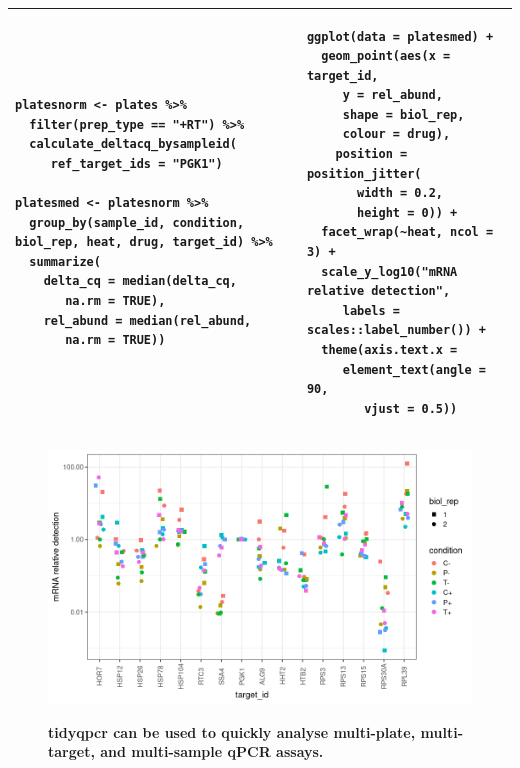 \documentclass{SBCbookchapter}
\begin{document}
\begin{center}
\begin{tabular}{| p{5.6cm}  p{5.6cm} |}
\hline
 \begin{lstlisting}[firstnumber=70]
 platesnorm <- plates %>%
  filter(prep_type == "+RT") %>%
  calculate_deltacq_bysampleid(
     ref_target_ids = "PGK1")

platesmed <- platesnorm %>%
  group_by(sample_id, condition, biol_rep, heat, drug, target_id) %>%
  summarize(
    delta_cq = median(delta_cq,
       na.rm = TRUE),
    rel_abund = median(rel_abund,
       na.rm = TRUE))
 \end{lstlisting}& 
 \begin{lstlisting}[firstnumber=83]
ggplot(data = platesmed) +
  geom_point(aes(x = target_id,
     y = rel_abund, 
     shape = biol_rep,
     colour = drug),
    position = position_jitter(
       width = 0.2,
       height = 0)) +
  facet_wrap(~heat, ncol = 3) +
  scale_y_log10("mRNA relative detection",
     labels = scales::label_number()) +
  theme(axis.text.x = 
     element_text(angle = 90,
        vjust = 0.5))
\end{lstlisting}   \\
\hline
\end{tabular}
\end{center}

\begin{figure}[t]

{\centering \includegraphics[width=\linewidth]{figures/example_normalised_deltacq_multiplate_figure}}

\caption{\textbf{tidyqpcr can be used to quickly analyse multi-plate, multi-target, and multi-sample qPCR assays. }}\label{fig:tidyqpcr-multi-plate}
\end{figure}
\end{document}
